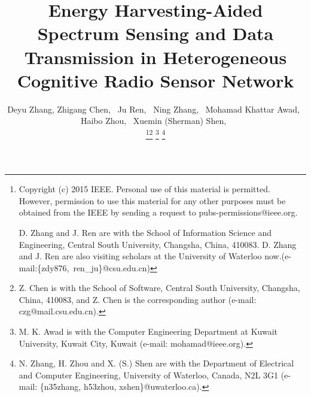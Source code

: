 \documentclass[journal]{IEEEtran} \ifCLASSINFOpdf
\begin{document}
\title{Energy Harvesting-Aided Spectrum Sensing and Data Transmission in Heterogeneous Cognitive Radio Sensor Network}
\author{\normalsize{
Deyu Zhang,
Zhigang Chen,~
Ju Ren,~
Ning Zhang,~
Mohamad Khattar Awad,~
Haibo Zhou,~
Xuemin (Sherman) Shen,~



\thanks{Copyright (c) 2015 IEEE. Personal use of this material is permitted. However, permission to use this material for any other purposes must be obtained from the IEEE by sending a request to pubs-permissions@ieee.org.

D. Zhang and J. Ren are with the School of Information Science and Engineering, Central South University, Changsha, China, 410083. D. Zhang and J. Ren are also visiting scholars at the University of Waterloo now.(e-mail:\{zdy876,~ren\_ju\}@csu.edu.cn)}\thanks{Z. Chen is with the School of Software, Central South University, Changsha, China, 410083, and Z. Chen is the corresponding author (e-mail: czg@mail.csu.edu.cn).}
\thanks{M. K. Awad is with the Computer Engineering Department at Kuwait University, Kuwait City, Kuwait (e-mail: mohamad@ieee.org).}
\thanks{N. Zhang, H. Zhou and X. (S.) Shen are with the Department of Electrical and Computer Engineering, University of Waterloo, Canada, N2L 3G1 (e-mail: \{n35zhang, h53zhou, xshen\}@uwaterloo.ca).}
}
}
\end{document}
